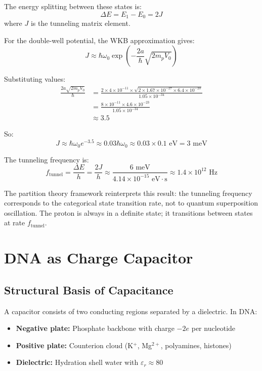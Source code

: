 \documentclass[twocolumn,10pt]{article}
\theoremstyle{remark}
\begin{document}
The energy splitting between these states is:
\begin{equation}
\Delta E = E_1 - E_0 = 2J
\end{equation}
where $J$ is the tunneling matrix element.

For the double-well potential, the WKB approximation gives:
\begin{equation}
J \approx \hbar\omega_0 \exp\left(-\frac{2a}{\hbar}\sqrt{2m_p V_0}\right)
\end{equation}

Substituting values:
\begin{align}
\frac{2a\sqrt{2m_p V_0}}{\hbar} &= \frac{2 \times 4 \times 10^{-11} \times \sqrt{2 \times 1.67 \times 10^{-27} \times 6.4 \times 10^{-20}}}{1.05 \times 10^{-34}} \\
&= \frac{8 \times 10^{-11} \times 4.6 \times 10^{-23}}{1.05 \times 10^{-34}} \\
&\approx 3.5
\end{align}

So:
\begin{equation}
J \approx \hbar\omega_0 e^{-3.5} \approx 0.03 \hbar\omega_0 \approx 0.03 \times 0.1 \text{ eV} = 3 \text{ meV}
\end{equation}

The tunneling frequency is:
\begin{equation}
f_{\mathrm{tunnel}} = \frac{\Delta E}{h} = \frac{2J}{h} \approx \frac{6 \text{ meV}}{4.14 \times 10^{-15} \text{ eV}\cdot\text{s}} \approx 1.4 \times 10^{12} \text{ Hz}
\end{equation}

The partition theory framework reinterprets this result: the tunneling frequency corresponds to the categorical state transition rate, not to quantum superposition oscillation. The proton is always in a definite state; it transitions between states at rate $f_{\mathrm{tunnel}}$.

\section{DNA as Charge Capacitor}

\subsection{Structural Basis of Capacitance}

A capacitor consists of two conducting regions separated by a dielectric. In DNA:
\begin{itemize}
\item \textbf{Negative plate:} Phosphate backbone with charge $-2e$ per nucleotide
\item \textbf{Positive plate:} Counterion cloud (K$^+$, Mg$^{2+}$, polyamines, histones)
\item \textbf{Dielectric:} Hydration shell water with $\varepsilon_r \approx 80$
\end{itemize}
\end{document}
